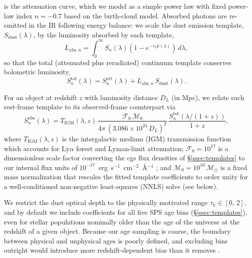 \documentclass[modern,linenumbers]{aastex701}
\newcommand{\tauv}{\ensuremath{\tau_V}}
\newcommand{\msun}{\ensuremath{\mathcal{M}_{\odot}}}
\begin{document}
\noindent is the attenuation curve, which we model as a simple power
law with fixed power-law index $n=-0.7$ based on the
\citet{charlot00a} birth-cloud model.  Absorbed photons are re-emitted
in the IR following energy balance: we scale the \citet{draine07a}
dust emission template, $S_\mathrm{dust}(\lambda)$, by the luminosity
absorbed by each template,
\begin{equation}
  L_{\mathrm{abs},n} = \int_0^\infty S_n(\lambda) (1 - e^{-\tauv
    k(\lambda)})\,d\lambda,
  \label{eq:labs}
\end{equation}
so that the total (attenuated plus reradiated) continuum template
conserves bolometric luminosity,
\begin{equation}
  S_n^\mathrm{tot}(\lambda) = S_n^\mathrm{att}(\lambda) +
  L_{\mathrm{abs},n}\,S_\mathrm{dust}(\lambda).
  \label{eq:ftot}
\end{equation}

For an object at redshift $z$ with luminosity distance $D_L$ (in Mpc),
we relate each rest-frame template to its observed-frame counterpart
via
\begin{equation}
  S_n^\mathrm{obs}(\lambda)
  =
  T_\mathrm{IGM}(\lambda,z)\,
  \frac{\mathcal{F}_0\,\mathcal{M}_0}
       {4\pi\,(3.086\times10^{24}\,D_L)^2}
  \,\frac{S_n^\mathrm{tot}(\lambda/(1+z))}{1+z},
  \label{eq:zfactor}
\end{equation}
where $T_\mathrm{IGM}(\lambda,z)$ is the \citet{inoue14a}
intergalactic medium (IGM) transmission function which accounts for
Ly$\alpha$ forest and Lyman-limit attenuation; $\mathcal{F}_0 =
10^{17}$ is a dimensionless scale factor converting the cgs flux
densities of \S\ref{ssec:templates} to our internal flux units of
$10^{-17}$~erg~s$^{-1}$~cm$^{-2}$~\AA$^{-1}$ \citep{guy23a}; and
$\mathcal{M}_0 = 10^{10}\,\msun$ is a fixed mass normalization that
rescales the fitted template coefficients to order unity for a
well-conditioned non-negative least-squares (NNLS) solve (see below).


We restrict the dust optical depth to the physically motivated range
$\tauv \in [0,\,2]$, and by default we include coefficients for all
five SPS age bins (\S\ref{ssec:templates}), even for stellar
populations nominally older than the age of the universe at the
redshift of a given object. Because our age sampling is coarse, the
boundary between physical and unphysical ages is poorly defined, and
excluding bins outright would introduce more redshift-dependent bias
than it removes \citep{leja19a}.
\end{document}
